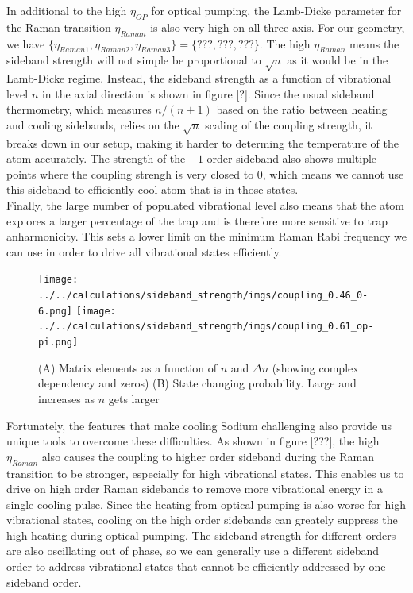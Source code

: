 \documentclass[aps,prl,twocolumn,groupedaddress]{revtex4-1}
\begin{document}
In additional to the high $\eta_{OP}$ for optical pumping, the Lamb-Dicke parameter for the Raman
transition $\eta_{Raman}$ is also very high on all three axis. For our geometry, we have $\{\eta_{Raman1},\eta_{Raman2},\eta_{Raman3}\} = \{???, ???, ???\}$.
The high $\eta_{Raman}$ means the sideband strength will not simple be proportional to $\sqrt{n}$ as it would be in the Lamb-Dicke regime. Instead, the sideband strength as a function of vibrational level $n$ in the axial direction is shown in figure [?].
Since the usual sideband thermometry, which measures $n/(n + 1)$ based on the ratio between heating and cooling sidebands, relies on the $\sqrt{n}$ scaling of the coupling strength, it breaks down
in our setup, making it harder to determing the temperature of the atom accurately. The strength
of the $-1$ order sideband also shows multiple points where the coupling strengh is very closed to
$0$, which means we cannot use this sideband to efficiently cool atom that is in those states.\\

Finally, the large number of populated vibrational level also means that the atom explores a larger percentage of the trap and is therefore more sensitive to trap anharmonicity.
This sets a lower limit on the minimum Raman Rabi frequency we can use in order to drive all
vibrational states efficiently.\\


\begin{figure}
  \texttt{[image: ../../calculations/sideband\_strength/imgs/coupling\_0.46\_0-6.png]}
  \texttt{[image: ../../calculations/sideband\_strength/imgs/coupling\_0.61\_op-pi.png]}
  \caption{(A) Matrix elements as a function of $n$ and $\Delta n$ (showing complex dependency and zeros) (B) State changing probability. Large and increases as $n$ gets larger
    \label{f-ld}}
\end{figure}

Fortunately, the features that make cooling Sodium challenging also provide us unique tools to
overcome these difficulties. As shown in figure [???], the high $\eta_{Raman}$ also causes the
coupling to higher order sideband during the Raman transition to be stronger,
especially for high vibrational states. This enables us to drive on high order Raman sidebands
to remove more vibrational energy in a single cooling pulse.
Since the heating from optical pumping is also worse for high vibrational states,
cooling on the high order sidebands can greately suppress the high heating during optical pumping.
The sideband strength for different orders are also oscillating out of phase, so we can generally
use a different sideband order to address vibrational states that cannot be efficiently addressed
by one sideband order.\\
\end{document}
